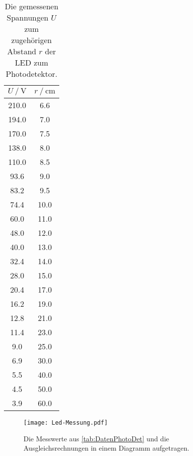 \begin{table}
  \centering
  \caption{Die gemessenen Spannungen $U$ zum zugehörigen Abstand $r$ der LED zum Photodetektor.}
  \begin{tabular}{cc}
    \toprule
    {$U \mathbin{/} \unit{\volt}$} &
    {$r \mathbin{/} \unit{\centi\meter}$} \\
    \midrule
      210.0 & 6.6 \\
      194.0 & 7.0 \\
      170.0 & 7.5 \\
      138.0 & 8.0 \\
      110.0 & 8.5 \\
      93.6 & 9.0 \\
      83.2 & 9.5 \\
      74.4 & 10.0 \\
      60.0 & 11.0 \\
      48.0 & 12.0 \\
      40.0 & 13.0 \\
      32.4 & 14.0 \\
      28.0 & 15.0 \\
      20.4 & 17.0 \\
      16.2 & 19.0 \\
      12.8 & 21.0 \\
      11.4 & 23.0 \\
      9.0 & 25.0 \\
      6.9 & 30.0 \\
      5.5 & 40.0 \\
      4.5 & 50.0 \\
      3.9 & 60.0 \\
    \bottomrule
  \end{tabular}
  \label{tab:DatenPhotoDet}
\end{table}
\begin{figure}
  \centering
  \texttt{[image: Led-Messung.pdf]}
  \caption{Die Messwerte aus \autoref{tab:DatenPhotoDet} und die Ausgleichsrechnungen in einem Diagramm aufgetragen.}
  \label{fig:PhotoDet}
\end{figure}
